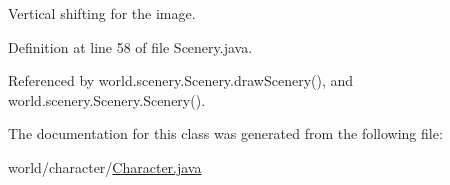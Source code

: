 Vertical shifting for the image. 



Definition at line 58 of file Scenery.\-java.



Referenced by world.\-scenery.\-Scenery.\-draw\-Scenery(), and world.\-scenery.\-Scenery.\-Scenery().



The documentation for this class was generated from the following file\-:\begin{DoxyCompactItemize}
\item 
world/character/\hyperlink{_character_8java}{Character.\-java}\end{DoxyCompactItemize}
